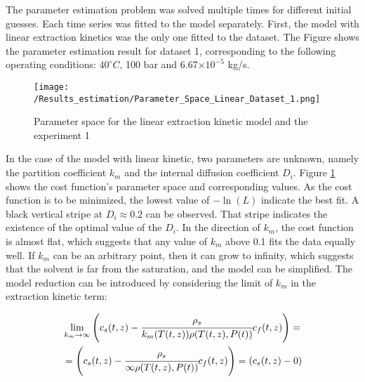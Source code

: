 \documentclass[../Supercritical_fluid_extraction_of_essential_oil_from_chamomile.tex]{subfiles}
\begin{document}
	
	\label{CH: Results}
	
	The parameter estimation problem was solved multiple times for different initial guesses. Each time series was fitted to the model separately. First, the model with linear extraction kinetics was the only one fitted to the dataset. The Figure shows the parameter estimation result for dataset 1, corresponding to the following operating conditions: $40^\circ C$, 100 bar and 6.67$\times 10^{-5}$ kg/s.
	
	\begin{figure}[!h]
		\centering
		\texttt{[image: /Results\_estimation/Parameter\_Space\_Linear\_Dataset\_1.png]}
		\caption{Parameter space for the linear extraction kinetic model and the experiment 1}
		\label{fig: Fit_1_linear}
	\end{figure}
	
	In the case of the model with linear kinetic, two parameters are unknown, namely the partition coefficient $k_m$ and the internal diffusion coefficient $D_i$. Figure \ref{fig: Fit_1_linear} shows the cost function's parameter space and corresponding values. As the cost function is to be minimized, the lowest value of $-\ln(L)$ indicate the best fit. A black vertical stripe at $D_i \approx 0.2$ can be observed. That stripe indicates the existence of the optimal value of the $D_i$. In the direction of $k_m$, the cost function is almost flat, which suggests that any value of $k_m$ above 0.1 fits the data equally well. If $k_m$ can be an arbitrary point, then it can grow to infinity, which suggests that the solvent is far from the saturation, and the model can be simplified. The model reduction can be introduced by considering the limit of $k_m$ in the extraction kinetic term: 
	
	{\footnotesize
		\begin{equation*}
			\begin{split}
				&\lim_{k_m \rightarrow \infty} \left({\color{black}{\color{black} c_s} }(t,z)  - \cfrac{{\color{black}\rho_s}}{{\color{black}k_m}({\color{black}T}(t,z)){\color{black}\rho}({\color{black}T}(t,z),{\color{black}P}(t))}  {\color{black}c_f}(t,z) \right)  = \\
				&= \left({\color{black}{\color{black} c_s} }(t,z)  - \cfrac{{\color{black}\rho_s}}{\infty{\color{black}\rho}({\color{black}T}(t,z),{\color{black}P}(t))}  {\color{black}c_f}(t,z) \right) = \left({\color{black}{\color{black} c_s} }(t,z) - 0 \right)
			\end{split}
	\end{equation*} }
	
\end{document}
